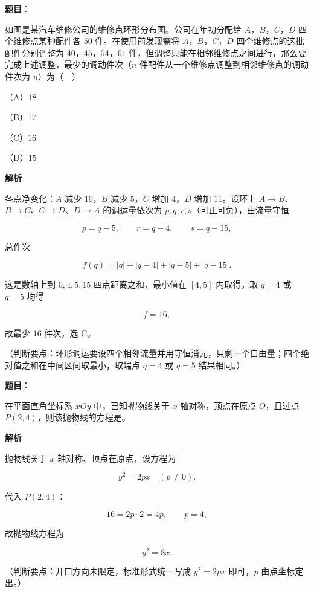 \begin{answer}

\textbf{题目}：

如图是某汽车维修公司的维修点环形分布图。公司在年初分配给 $A$，$B$，$C$，$D$ 四个维修点某种配件各 $50$ 件。在使用前发现需将 $A$，$B$，$C$，$D$ 四个维修点的这批配件分别调整为 $40$，$45$，$54$，$61$ 件，但调整只能在相邻维修点之间进行，那么要完成上述调整，最少的调动件次（$n$ 件配件从一个维修点调整到相邻维修点的调动件次为 $n$）为（　）
\nopagebreak[4]
\begin{center}\end{center}
\nopagebreak[4]
（A）$18$

（B）$17$

（C）$16$

（D）$15$

\textbf{解析}

各点净变化：$A$ 减少 $10$，$B$ 减少 $5$，$C$ 增加 $4$，$D$ 增加 $11$。设环上 $A\to B$、$B\to C$、$C\to D$、$D\to A$ 的调运量依次为 $p,q,r,s$（可正可负），由流量守恒

\nopagebreak[4]
\[p=q-5,\qquad r=q-4,\qquad s=q-15,\]

总件次

\nopagebreak[4]
\[f(q)=|q|+|q-4|+|q-5|+|q-15|.\]

这是数轴上到 $0,4,5,15$ 四点距离之和，最小值在 $[4,5]$ 内取得，取 $q=4$ 或 $q=5$ 均得

\nopagebreak[4]
\[f=16,\]

故最少 $16$ 件次，选 C。

（判断要点：环形调运要设四个相邻流量并用守恒消元，只剩一个自由量；四个绝对值之和在中间区间取最小，取端点 $q=4$ 或 $q=5$ 结果相同。）


\end{answer}
\begin{answer}

\textbf{题目}：

在平面直角坐标系 $xOy$ 中，已知抛物线关于 $x$ 轴对称，顶点在原点 $O$，且过点 $P(2,4)$，则该抛物线的方程是\gkblank{}。

\textbf{解析}

抛物线关于 $x$ 轴对称、顶点在原点，设方程为

\nopagebreak[4]
\[y^2=2px\quad(p\neq0).\]

代入 $P(2,4)$：

\nopagebreak[4]
\[16=2p\cdot2=4p,\qquad p=4,\]

故抛物线方程为

\nopagebreak[4]
\[y^2=8x.\]

（判断要点：开口方向未限定，标准形式统一写成 $y^2=2px$ 即可，$p$ 由点坐标定出。）


\end{answer}
